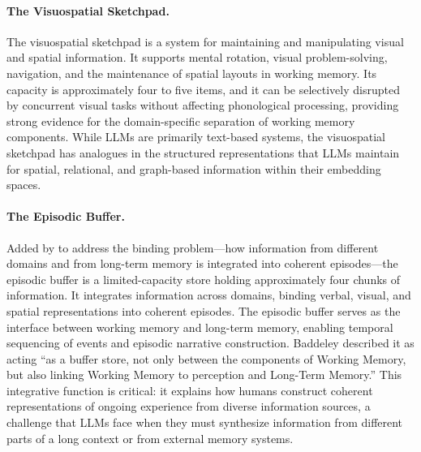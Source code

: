 \paragraph{The Visuospatial Sketchpad.} The visuospatial sketchpad is a system for maintaining and manipulating visual and spatial information. It supports mental rotation, visual problem-solving, navigation, and the maintenance of spatial layouts in working memory. Its capacity is approximately four to five items, and it can be selectively disrupted by concurrent visual tasks without affecting phonological processing, providing strong evidence for the domain-specific separation of working memory components. While LLMs are primarily text-based systems, the visuospatial sketchpad has analogues in the structured representations that LLMs maintain for spatial, relational, and graph-based information within their embedding spaces.

\paragraph{The Episodic Buffer.} Added by \citet{baddeley2000episodic} to address the binding problem---how information from different domains and from long-term memory is integrated into coherent episodes---the episodic buffer is a limited-capacity store holding approximately four chunks of information. It integrates information across domains, binding verbal, visual, and spatial representations into coherent episodes. The episodic buffer serves as the interface between working memory and long-term memory, enabling temporal sequencing of events and episodic narrative construction. Baddeley described it as acting ``as a buffer store, not only between the components of Working Memory, but also linking Working Memory to perception and Long-Term Memory.'' This integrative function is critical: it explains how humans construct coherent representations of ongoing experience from diverse information sources, a challenge that LLMs face when they must synthesize information from different parts of a long context or from external memory systems.

